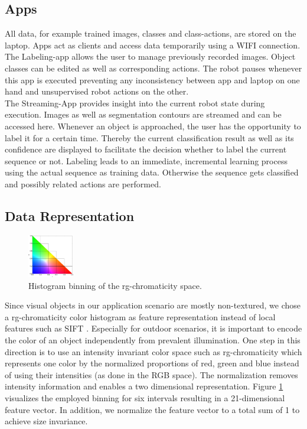 \documentclass[conference]{IEEEtran}
\begin{document}
\subsection{Apps}\label{labelingapp}
All data, for example trained images, classes and class-actions, are stored on the laptop. Apps act as clients and access data temporarily using a WIFI connection. The Labeling-app allows the user to manage previously recorded images. Object classes can be edited as well as corresponding actions. 
The robot pauses whenever this app is executed preventing any inconsistency between app and laptop on one hand and unsupervised
robot actions on the other.\\
The Streaming-App provides insight into the current robot state during execution. Images as well as segmentation contours are streamed and can be accessed here. 
Whenever an object is approached, the user has the opportunity to label it for a certain time.
Thereby the current classification result as well as its confidence are displayed to facilitate the decision whether to label the current sequence or not.
Labeling leads to an immediate, incremental learning process using the actual sequence as training data.
Otherwise the sequence gets classified and possibly related actions are performed. 

\subsection{Data Representation}
\begin{figure}
\centering
\includegraphics[width=0.18\textwidth]{Images/General/RgChromacityQuads.png}
\caption{Histogram binning of the rg-chromaticity space.}
\label{rgTable}
\end{figure}
Since visual objects in our application scenario
are mostly non-textured, we chose a rg-chromaticity color histogram as feature representation instead of local features such as SIFT \cite{Lowe:1999:ORL:850924.851523}. 
Especially for outdoor scenarios, it is important to encode the color of an object independently from prevalent illumination.
One step in this direction is to use an intensity invariant color space such as rg-chromaticity \cite{Jain:2005:HFR:1062383}
which represents one color by the normalized proportions of red, green and blue instead of using their intensities (as done in the RGB space).
The normalization removes intensity information and enables a two dimensional representation.
Figure \ref{rgTable} visualizes the employed binning for six intervals resulting in a 21-dimensional feature vector. 
In addition, we normalize the feature vector to a total sum of 1 to achieve size invariance. 
\end{document}
